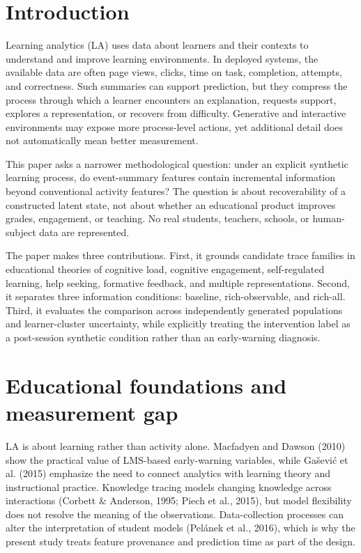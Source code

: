 \documentclass[11pt]{article}
\begin{document}
\section{Introduction}

Learning analytics (LA) uses data about learners and their contexts to understand and improve learning environments. In deployed systems, the available data are often page views, clicks, time on task, completion, attempts, and correctness. Such summaries can support prediction, but they compress the process through which a learner encounters an explanation, requests support, explores a representation, or recovers from difficulty. Generative and interactive environments may expose more process-level actions, yet additional detail does not automatically mean better measurement.

This paper asks a narrower methodological question: under an explicit synthetic learning process, do event-summary features contain incremental information beyond conventional activity features? The question is about recoverability of a constructed latent state, not about whether an educational product improves grades, engagement, or teaching. No real students, teachers, schools, or human-subject data are represented.

The paper makes three contributions. First, it grounds candidate trace families in educational theories of cognitive load, cognitive engagement, self-regulated learning, help seeking, formative feedback, and multiple representations. Second, it separates three information conditions: baseline, rich-observable, and rich-all. Third, it evaluates the comparison across independently generated populations and learner-cluster uncertainty, while explicitly treating the intervention label as a post-session synthetic condition rather than an early-warning diagnosis.

\section{Educational foundations and measurement gap}

LA is about learning rather than activity alone. Macfadyen and Dawson (2010) show the practical value of LMS-based early-warning variables, while Gašević et al. (2015) emphasize the need to connect analytics with learning theory and instructional practice. Knowledge tracing models changing knowledge across interactions (Corbett \& Anderson, 1995; Piech et al., 2015), but model flexibility does not resolve the meaning of the observations. Data-collection processes can alter the interpretation of student models (Pelánek et al., 2016), which is why the present study treats feature provenance and prediction time as part of the design.
\end{document}
